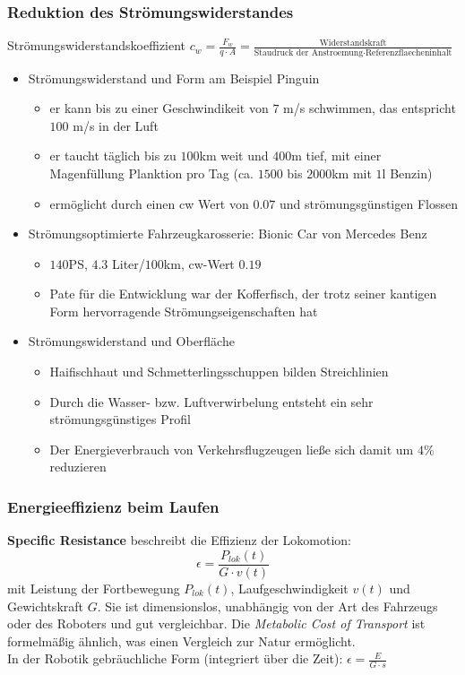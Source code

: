 \subsubsection{Reduktion des Strömungswiderstandes}
Strömungswiderstandskoeffizient $c_w = \frac{F_w}{q \cdot A} = \frac{\text{Widerstandskraft}}{\text{Staudruck der Anstroemung} \cdot \text{Referenzflaecheninhalt}}$
\begin{itemize}
	\item Strömungswiderstand und Form am Beispiel Pinguin
	\begin{itemize}
		\item er kann bis zu einer Geschwindikeit von $7$ m/s schwimmen, das entspricht $100$ m/s in der Luft
		\item er taucht täglich bis zu $100$km weit und $400$m tief, mit einer Magenfüllung Planktion pro Tag (ca. $1500$ bis $2000$km mit $1$l Benzin)
		\item ermöglicht durch einen cw Wert von $0.07$ und strömungsgünstigen Flossen
	\end{itemize}
	\item Strömungsoptimierte Fahrzeugkarosserie: Bionic Car von Mercedes Benz
	\begin{itemize}
		\item $140$PS, $4.3$ Liter/$100$km, cw-Wert $0.19$
		\item Pate für die Entwicklung war der Kofferfisch, der trotz seiner kantigen Form hervorragende Strömungseigenschaften hat
	\end{itemize}
	\item Strömungswiderstand und Oberfläche
	\begin{itemize}
		\item Haifischhaut und Schmetterlingsschuppen bilden Streichlinien
		\item Durch die Wasser- bzw. Luftverwirbelung entsteht ein sehr strömungsgünstiges Profil
		\item Der Energieverbrauch von Verkehrsflugzeugen ließe sich damit um $4$\% reduzieren
	\end{itemize}
\end{itemize}

\subsubsection{Energieeffizienz beim Laufen}
\textbf{Specific Resistance} beschreibt die Effizienz der Lokomotion:
\begin{equation}
 \epsilon = \frac{P_{lok}(t)}{G \cdot v(t)}
\end{equation}
mit Leistung der Fortbewegung $P_{lok}(t)$, Laufgeschwindigkeit $v(t)$ und Gewichtskraft $G$. 
Sie ist dimensionslos, unabhängig von der Art des Fahrzeugs oder des Roboters und gut vergleichbar.
Die \emph{Metabolic Cost of Transport} ist formelmäßig ähnlich, was einen Vergleich zur Natur ermöglicht.\\
In der Robotik gebräuchliche Form (integriert über die Zeit): $\epsilon = \frac{E}{G \cdot s}$

